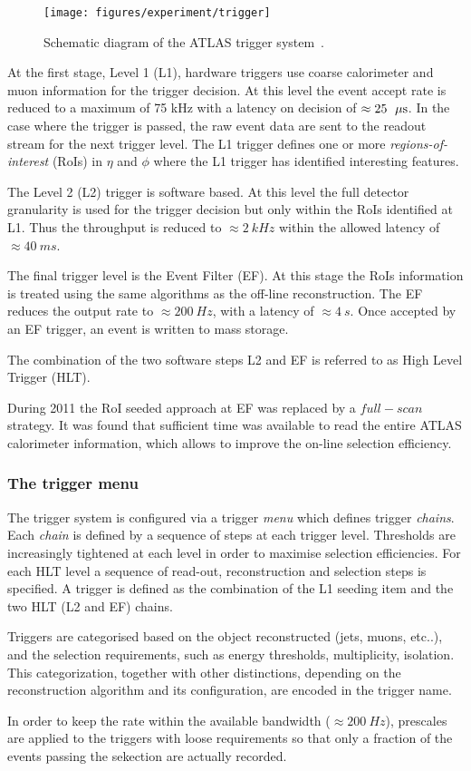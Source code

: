 \begin{figure}[ht]
\begin{center}
\texttt{[image: figures/experiment/trigger]}
\caption[ATLAS trigger system]{
  Schematic diagram of the ATLAS trigger system~\cite{trigger}. }
\label{fig:trigger}
\end{center}
\end{figure}

At the first stage, Level 1 (L1), hardware triggers use coarse
calorimeter and muon information for the trigger decision. At this
level the event accept rate is reduced to a maximum of 75 kHz with a
latency on decision of $\approx{}25~\; \mu\mathrm{s}{}$. In the case where the
trigger is passed, the raw event data are sent to the readout stream
for the next trigger level. The L1 trigger defines one or more
\emph{regions-of-interest} (RoIs) in $\eta{}$ and $\phi{}$ where the
L1 trigger has identified interesting features. 

The Level 2 (L2) trigger is software based. At this level the full detector
granularity is used for the trigger decision but only within the RoIs
identified at L1. Thus the throughput is reduced to
$\approx{}2~kHz$ within the allowed latency of $\approx{}40~ms$.

The final trigger level is the Event Filter (EF). At this stage the RoIs
information is treated using the same algorithms as the off-line
reconstruction. The EF reduces the output rate to $\approx{}200~Hz$, 
with a latency of $\approx{}4~s$. Once accepted by an EF trigger, an
event is written to mass storage.

The combination of the two software steps L2 and EF is referred to 
as High Level Trigger (HLT).

During 2011 the RoI seeded approach at EF was replaced by a
$full-scan$ strategy. It was found that sufficient time was available
to read the entire ATLAS calorimeter information, which allows to
improve the on-line selection efficiency.

\subsubsection{The trigger menu}

The trigger system is configured via a trigger \textit{menu} which defines trigger \textit{chains}.
Each \textit{chain} is defined by a sequence of steps at each trigger level.
Thresholds are increasingly tightened at each level in order to maximise selection efficiencies.
For each HLT level a sequence of read-out, reconstruction and selection steps is specified.
A trigger is defined as the combination of the L1 seeding item and the two HLT (L2 and EF) chains.

Triggers are categorised based on the object reconstructed (jets, muons, etc..), 
and the selection requirements, such as energy thresholds, multiplicity, isolation.
This categorization, together with other distinctions, depending on the reconstruction algorithm
and its configuration, are encoded in the trigger name.

In order to keep the rate within the available bandwidth ($\approx{}200~Hz$), 
prescales are applied to the triggers with loose requirements so that
only a fraction of the events passing the sekection are actually recorded.

